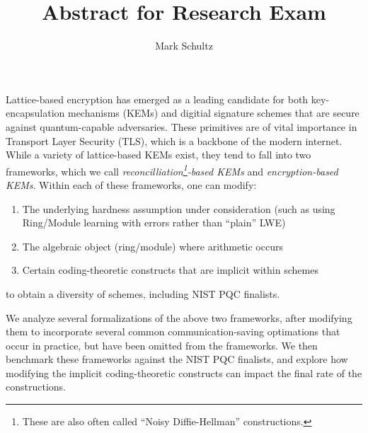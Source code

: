 \documentclass{article}
\begin{document}
	\author{Mark Schultz}
	\title{Abstract for Research Exam}
	\maketitle
	Lattice-based encryption has emerged as a leading candidate for both key-encapsulation mechanisms (KEMs) and digitial signature schemes that are secure against quantum-capable adversaries.
	These primitives are of vital importance in Transport Layer Security (TLS), which is a backbone of the modern internet.
	While a variety of lattice-based KEMs exist, they tend to fall into two frameworks, which we call \emph{reconcilliation\footnote{These are also often called ``Noisy Diffie-Hellman'' constructions.}-based KEMs} and \emph{encryption-based KEMs}.
	Within each of these frameworks, one can modify:
	\begin{enumerate}
		\item The underlying hardness assumption under consideration (such as using Ring/Module learning with errors rather than ``plain'' LWE)
		\item The algebraic object (ring/module) where arithmetic occurs
		\item Certain coding-theoretic constructs that are implicit within schemes 
	\end{enumerate}
	to obtain a diversity of schemes, including NIST PQC finalists.
	
	We analyze several formalizations of the above two frameworks, after modifying them to incorporate several common communication-saving optimations that occur in practice, but have been omitted from the frameworks.
	We then benchmark these frameworks against the NIST PQC finalists, and explore how modifying the implicit coding-theoretic constructs can impact the final rate of the constructions.
\end{document}
